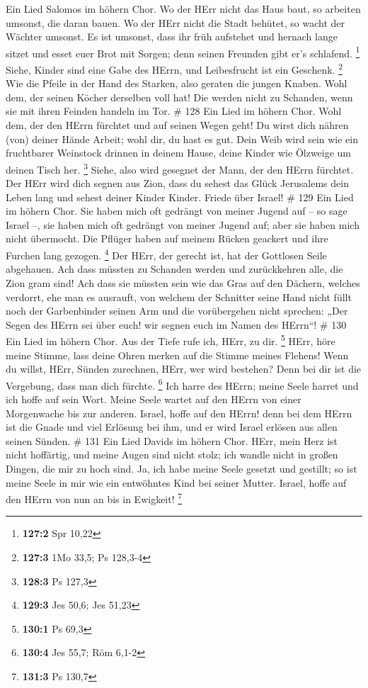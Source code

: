  Ein Lied Salomos im höhern Chor. Wo der HErr nicht das Haus
baut, so arbeiten umsonst, die daran bauen. Wo der HErr nicht die Stadt
behütet, so wacht der Wächter umsonst.  Es ist umsonst, dass
ihr früh aufstehet und hernach lange sitzet und esset euer Brot mit
Sorgen; denn seinen Freunden gibt er's schlafend. \footnote{\textbf{127:2}
  Spr 10,22}  Siehe, Kinder sind eine Gabe des HErrn, und
Leibesfrucht ist ein Geschenk. \footnote{\textbf{127:3} 1Mo 33,5; Ps
  128,3-4}  Wie die Pfeile in der Hand des Starken, also
geraten die jungen Knaben.  Wohl dem, der seinen Köcher
derselben voll hat! Die werden nicht zu Schanden, wenn sie mit ihren
Feinden handeln im Tor. \# 128  Ein Lied im höhern Chor.
Wohl dem, der den HErrn fürchtet und auf seinen Wegen geht! 
Du wirst dich nähren (von) deiner Hände Arbeit; wohl dir, du hast es
gut.  Dein Weib wird sein wie ein fruchtbarer Weinstock
drinnen in deinem Hause, deine Kinder wie Ölzweige um deinen Tisch her.
\footnote{\textbf{128:3} Ps 127,3}  Siehe, also wird
gesegnet der Mann, der den HErrn fürchtet.  Der HErr wird
dich segnen aus Zion, dass du sehest das Glück Jerusalems dein Leben
lang  und sehest deiner Kinder Kinder. Friede über Israel!
\# 129  Ein Lied im höhern Chor. Sie haben mich oft gedrängt
von meiner Jugend auf -- so sage Israel --,  sie haben mich
oft gedrängt von meiner Jugend auf; aber sie haben mich nicht übermocht.
 Die Pflüger haben auf meinem Rücken geackert und ihre
Furchen lang gezogen. \footnote{\textbf{129:3} Jes 50,6; Jes 51,23}
 Der HErr, der gerecht ist, hat der Gottlosen Seile
abgehauen.  Ach dass müssten zu Schanden werden und
zurückkehren alle, die Zion gram sind!  Ach dass sie müssten
sein wie das Gras auf den Dächern, welches verdorrt, ehe man es
ausrauft,  von welchem der Schnitter seine Hand nicht füllt
noch der Garbenbinder seinen Arm  und die vorübergehen nicht
sprechen: „Der Segen des HErrn sei über euch! wir segnen euch im Namen
des HErrn``! \# 130  Ein Lied im höhern Chor. Aus der Tiefe
rufe ich, HErr, zu dir. \footnote{\textbf{130:1} Ps 69,3} 
HErr, höre meine Stimme, lass deine Ohren merken auf die Stimme meines
Flehens!  Wenn du willst, HErr, Sünden zurechnen, HErr, wer
wird bestehen?  Denn bei dir ist die Vergebung, dass man
dich fürchte. \footnote{\textbf{130:4} Jes 55,7; Röm 6,1-2} 
Ich harre des HErrn; meine Seele harret und ich hoffe auf sein Wort.
 Meine Seele wartet auf den HErrn von einer Morgenwache bis
zur anderen.  Israel, hoffe auf den HErrn! denn bei dem
HErrn ist die Gnade und viel Erlösung bei ihm,  und er wird
Israel erlösen aus allen seinen Sünden. \# 131  Ein Lied
Davids im höhern Chor. HErr, mein Herz ist nicht hoffärtig, und meine
Augen sind nicht stolz; ich wandle nicht in großen Dingen, die mir zu
hoch sind.  Ja, ich habe meine Seele gesetzt und gestillt;
so ist meine Seele in mir wie ein entwöhntes Kind bei seiner Mutter.
 Israel, hoffe auf den HErrn von nun an bis in Ewigkeit!
\footnote{\textbf{131:3} Ps 130,7}

